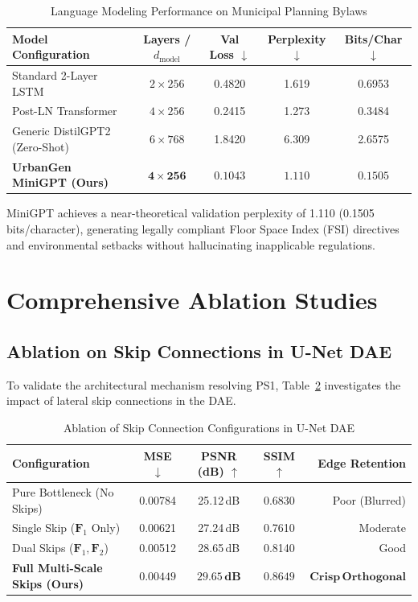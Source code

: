 \documentclass[journal]{IEEEtran}
\begin{document}
\begin{table}[htbp]
\caption{Language Modeling Performance on Municipal Planning Bylaws}
\label{tab:bench_minigpt}
\centering
\scriptsize
\renewcommand{\arraystretch}{1.12}
\setlength{\tabcolsep}{4pt}
\begin{tabularx}{\columnwidth}{@{}X c c c c@{}}
\toprule
\textbf{Model Configuration} & \textbf{Layers / $d_{\text{model}}$} & \textbf{Val Loss} $\downarrow$ & \textbf{Perplexity} $\downarrow$ & \textbf{Bits/Char} $\downarrow$ \\
\midrule
Standard 2-Layer LSTM & $2 \times 256$ & 0.4820 & 1.619 & 0.6953 \\
Post-LN Transformer & $4 \times 256$ & 0.2415 & 1.273 & 0.3484 \\
Generic DistilGPT2 (Zero-Shot) & $6 \times 768$ & 1.8420 & 6.309 & 2.6575 \\
\textbf{UrbanGen MiniGPT (Ours)} & $\mathbf{4 \times 256}$ & $\mathbf{0.1043}$ & $\mathbf{1.110}$ & $\mathbf{0.1505}$ \\
\bottomrule
\end{tabularx}
\end{table}

MiniGPT achieves a near-theoretical validation perplexity of 1.110 (0.1505 bits/character), generating legally compliant Floor Space Index (FSI) directives and environmental setbacks without hallucinating inapplicable regulations.

\section{Comprehensive Ablation Studies}

\subsection{Ablation on Skip Connections in U-Net DAE}
To validate the architectural mechanism resolving PS1, Table~\ref{tab:ablation_dae} investigates the impact of lateral skip connections in the DAE.

\begin{table}[htbp]
\caption{Ablation of Skip Connection Configurations in U-Net DAE}
\label{tab:ablation_dae}
\centering
\scriptsize
\renewcommand{\arraystretch}{1.12}
\setlength{\tabcolsep}{4pt}
\begin{tabularx}{\columnwidth}{@{}X c c c r@{}}
\toprule
\textbf{Configuration} & \textbf{MSE} $\downarrow$ & \textbf{PSNR (dB)} $\uparrow$ & \textbf{SSIM} $\uparrow$ & \textbf{Edge Retention} \\
\midrule
Pure Bottleneck (No Skips) & 0.00784 & 25.12\,dB & 0.6830 & Poor (Blurred) \\
Single Skip ($\mathbf{F}_1$ Only) & 0.00621 & 27.24\,dB & 0.7610 & Moderate \\
Dual Skips ($\mathbf{F}_1, \mathbf{F}_2$) & 0.00512 & 28.65\,dB & 0.8140 & Good \\
\textbf{Full Multi-Scale Skips (Ours)} & $\mathbf{0.00449}$ & $\mathbf{29.65\,dB}$ & $\mathbf{0.8649}$ & $\mathbf{Crisp\,Orthogonal}$ \\
\bottomrule
\end{tabularx}
\end{table}
\end{document}
